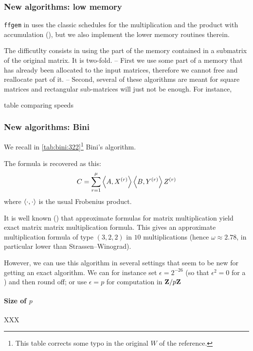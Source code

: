 \subsubsection{New algorithms: low memory}
%
\texttt{ffgem} in \fflas uses the classic schedules for the multiplication and
the product with accumulation (\cf \cite{Boyer:2009:sched}), but we also
implement the lower memory routines therein.
%
\par
%
The difficutlty consists in using the part of the memory contained in a
submatrix of the original matrix. It is two-fold. -- First we use some part
of a memory that has already been allocated to the input matrices, therefore
we cannot free and reallocate part of it. -- Second, several of these algorithms
are meant for square matrices and rectangular sub-matrices will just not be enough.
For instance,
%
\par
%
\danger table comparing speeds
%
\subsubsection{New algorithms: Bini}
%
 We recall
in \cref{tab:bini:322}\footnote{This table corrects some typo in the original
$W$ of the reference.} Bini's algorithm.
%

%
The formula is recovered as this:
\begin{equation} \label{eq:base}
   C = \sum_{r=1}^\mu \left\langle A, X^{(r)} \right\rangle \left\langle B, Y^{(r)} \right\rangle Z^{(r)}
\end{equation}
where $\left\langle\cdot, \cdot \right\rangle$ is the usual Frobenius product.
%
\par
%
It is well known (\cite{Bini:80:apa}) that approximate formulas for matrix
multiplication  yield exact matrix matrix multiplication formula.
This gives an approximate multiplication formula of type $(3, 2, 2)$ in $10$
multiplications (hence $\omega \approx 2.78$, in particular lower than
Strassen--Winograd).
%
\par
%
However, we can use this algorithm in several settings that seem to be new for
getting an exact algorithm.  We can for instance set $\epsilon = 2^{-26}$ (so
that $\epsilon^2 = 0$ for a \dbl) and then round off; or use $\epsilon = p$ for
computation in $\mathbf{Z}{/ p\mathbf{Z}}$
%
\paragraph{Size of  $p$}
%
XXX
%

